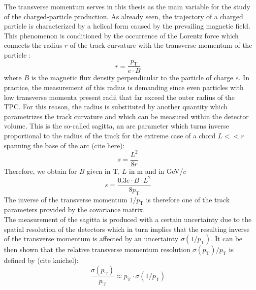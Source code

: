 \documentclass[12pt,a4paper]{report}
\begin{document}
The transverse momentum \pt serves in this thesis as the main variable for the study of the charged-particle production. As already seen, the trajectory of a charged particle is characterized by a helical form caused by the prevailing magnetic field. This phenomenon is conditioned by the occurrence of the Lorentz force which connects the radius $r$ of the track curvature with the transverse momentum of the particle \pt:
\begin{equation}
r = \dfrac{p_\text{T}}{e\cdot B}
\label{radius}
\end{equation}
where $B$ is the magnetic flux density perpendicular to the particle of charge $e$. In practice, the measurement of this radius is demanding since even particles with low transverse momenta present radii that far exceed the outer radius of the TPC. For this reason, the radius is substituted by another quantity which parametrizes the track curvature and which can be measured within the detector volume. This is the so-called sagitta, an arc parameter which turns inverse proportional to the radius of the track for the extreme case of a chord $L<<r$ spanning the base of the arc (cite here):
\begin{equation}
s = \dfrac{L^2}{8r}
\end{equation}
Therefore, we obtain for $B$ given in T, $L$ in m and \pt in GeV/$c$
\begin{equation}
s = \dfrac{0.3e \cdot B \cdot L^2}{8p_\text{T}}
\end{equation}
The inverse of the transverse momentum $1/p_\text{T}$ is therefore one of the track parameters provided by the covariance matrix.\\
The measurement of the sagitta is produced with a certain uncertainty due to the spatial resolution of the detectors which in turn implies that the resulting inverse of the transverse momentum is affected by an uncertainty $\sigma(1/p_\text{T})$. It can be then shown that the relative transverse momentum resolution $\sigma(p_\text{T})/p_\text{T}$ is defined by (cite knichel):
\begin{equation}
\dfrac{\sigma(p_\text{T})}{p_\text{T}} \approx p_\text{T} \cdot \sigma(1/p_\text{T})
\end{equation}
\end{document}
